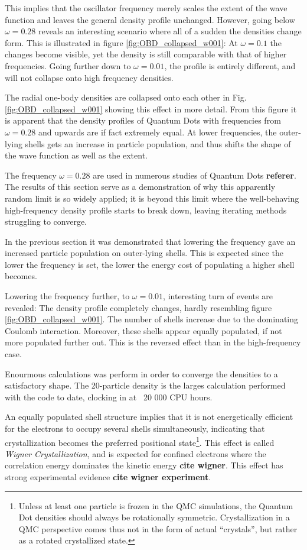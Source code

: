This implies that the oscillator frequency merely scales the extent of the wave function and leaves the general density profile unchanged. However, going below $\omega=0.28$ reveals an interesting scenario where all of a sudden the densities change form. This is illustrated in figure \ref{fig:OBD_collapsed_w001}: At $\omega=0.1$ the changes become visible, yet the density is still comparable with that of higher frequencies. Going further down to $\omega=0.01$, the profile is entirely different, and will not collapse onto high frequency densities.

The radial one-body densities are collapsed onto each other in Fig. \ref{fig:OBD_collapsed_w001} showing this effect in more detail. From this figure it is apparent that the density profiles of Quantum Dots with frequencies from $\omega=0.28$ and upwards are if fact extremely equal. At lower frequencies, the outer-lying shells gets an increase in particle population, and thus shifts the shape of the wave function as well as the extent.

The frequency $\omega=0.28$ are used in numerous studies of Quantum Dots \textbf{referer}. The results of this section serve as a demonstration of why this apparently random limit is so widely applied; it is beyond this limit where the well-behaving high-frequency density profile starts to break down, leaving iterating methods struggling to converge. 

In the previous section it was demonstrated that lowering the frequency gave an increased particle population on outer-lying shells. This is expected since the lower the frequency is set, the lower the energy cost of populating a higher shell becomes.

Lowering the frequency further, to $\omega=0.01$, interesting turn of events are revealed: The density profile completely changes, hardly resembling figure \ref{fig:OBD_collapsed_w001}. The number of shells increase due to the dominating Coulomb interaction. Moreover, these shells appear equally populated, if not more populated further out. This is the reversed effect than in the high-frequency case.

Enourmous calculations was perform in order to converge the densities to a satisfactory shape. The 20-particle density is the larges calculation performed with the code to date, clocking in at ~20 000 CPU hours.

An equally populated shell structure implies that it is not energetically efficient for the electrons to occupy several shells simultaneously, indicating that crystallization becomes the preferred positional state\footnote{Unless at least one particle is frozen in the QMC simulations, the Quantum Dot densities should always be rotationally symmetric. Crystallization in a QMC perspective comes thus not in the form of actual ``crystals'', but rather as a rotated crystallized state.}. This effect is called \textit{Wigner Crystallization}, and is expected for confined electrons where the correlation energy dominates the kinetic energy \textbf{cite wigner}. This effect has strong experimental evidence \textbf{cite wigner experiment}. 

